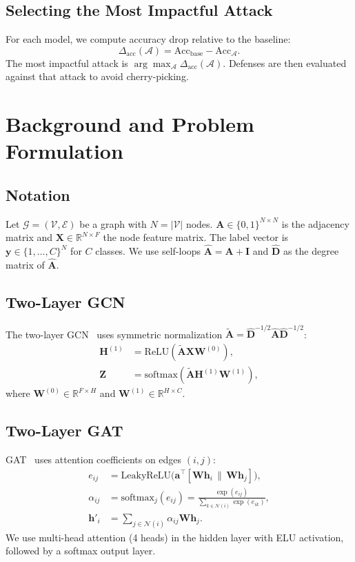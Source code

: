 \documentclass[conference]{IEEEtran}
\begin{document}
\subsection{Selecting the Most Impactful Attack}
For each model, we compute accuracy drop relative to the baseline:
\begin{equation}
\Delta_{\mathrm{acc}}(\mathcal{A}) = \mathrm{Acc}_{\mathrm{base}} - \mathrm{Acc}_{\mathcal{A}}.
\end{equation}
The most impactful attack is $\arg\max_{\mathcal{A}} \Delta_{\mathrm{acc}}(\mathcal{A})$. Defenses are then evaluated against that attack to avoid cherry-picking.

\section{Background and Problem Formulation}
\subsection{Notation}
Let $\mathcal{G}=(\mathcal{V},\mathcal{E})$ be a graph with $N=|\mathcal{V}|$ nodes. $\mathbf{A}\in\{0,1\}^{N\times N}$ is the adjacency matrix and $\mathbf{X}\in\mathbb{R}^{N\times F}$ the node feature matrix. The label vector is $\mathbf{y}\in\{1,\dots,C\}^{N}$ for $C$ classes. We use self-loops $\hat{\mathbf{A}}=\mathbf{A}+\mathbf{I}$ and $\hat{\mathbf{D}}$ as the degree matrix of $\hat{\mathbf{A}}$.

\subsection{Two-Layer GCN}
The two-layer GCN~\cite{kipf2017gcn} uses symmetric normalization $\tilde{\mathbf{A}}=\hat{\mathbf{D}}^{-1/2}\hat{\mathbf{A}}\hat{\mathbf{D}}^{-1/2}$:
\begin{align}
\mathbf{H}^{(1)} &= \mathrm{ReLU}(\tilde{\mathbf{A}}\mathbf{X}\mathbf{W}^{(0)}), \label{eq:gcn1}\\
\mathbf{Z} &= \mathrm{softmax}(\tilde{\mathbf{A}}\mathbf{H}^{(1)}\mathbf{W}^{(1)}), \label{eq:gcn2}
\end{align}
where $\mathbf{W}^{(0)}\in\mathbb{R}^{F\times H}$ and $\mathbf{W}^{(1)}\in\mathbb{R}^{H\times C}$.

\subsection{Two-Layer GAT}
GAT~\cite{velickovic2018gat} uses attention coefficients on edges $(i,j)$:
\begin{align}
e_{ij} &= \mathrm{LeakyReLU}\big(\mathbf{a}^\top[\mathbf{W}\mathbf{h}_i \,\|\, \mathbf{W}\mathbf{h}_j]\big), \\
\alpha_{ij} &= \mathrm{softmax}_j(e_{ij})=\frac{\exp(e_{ij})}{\sum_{k\in\mathcal{N}(i)}\exp(e_{ik})}, \\
\mathbf{h}'_i &= \sum_{j\in\mathcal{N}(i)}\alpha_{ij}\mathbf{W}\mathbf{h}_j .
\end{align}
We use multi-head attention (4 heads) in the hidden layer with ELU activation, followed by a softmax output layer.
\end{document}
